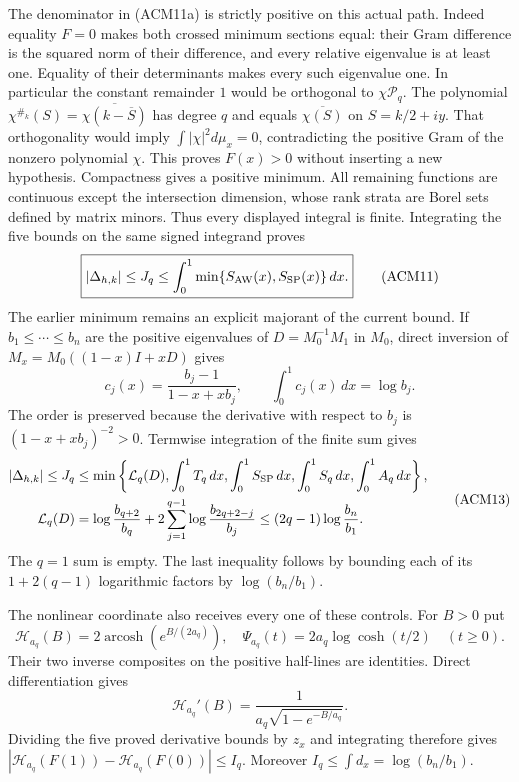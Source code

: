 The denominator in (ACM11a) is strictly positive on this actual path.
Indeed equality $F=0$ makes both crossed minimum sections equal:
their Gram difference is the squared norm of their difference,
and every relative eigenvalue is at least one. Equality of their
determinants makes every such eigenvalue one. In particular the
constant remainder $1$ would be orthogonal to $\chi\mathcal P_q$.
The polynomial $\chi^{\#_k}(S)=\overline{\chi(k-\overline S)}$
has degree $q$ and equals $\overline{\chi(S)}$ on $S=k/2+iy$.
That orthogonality would imply $\int|\chi|^2d\mu_x=0$, contradicting
the positive Gram of the nonzero polynomial $\chi$. This proves
$F(x)>0$ without inserting a new hypothesis. Compactness gives a
positive minimum. All remaining functions are continuous except
the intersection dimension, whose rank strata are Borel sets
defined by matrix minors. Thus every displayed integral is finite.
Integrating the five bounds on the same signed integrand proves
\[
 \boxed{|\Delta_{h,k}|\leq J_q
 \leq\int_0^1\min\{S_{\rm AW}(x),S_{\rm SP}(x)\}\,dx.}
 \tag{ACM11}
\]
The earlier minimum remains an explicit majorant of the current bound.
If $b_1\leq\cdots\leq b_n$ are the positive eigenvalues of
$D=M_0^{-1}M_1$ in $M_0$, direct inversion of
$M_x=M_0((1-x)I+xD)$ gives
\[
 c_j(x)=\frac{b_j-1}{1-x+xb_j},\qquad
 \int_0^1c_j(x)\,dx=\log b_j.
 \tag{ACM12}
\]
The order is preserved because the derivative with respect to $b_j$
is $(1-x+xb_j)^{-2}>0$. Termwise integration of the finite sum gives
\[
\begin{split}
 |\Delta_{h,k}|\leq J_q
 &\leq\min\left\{\mathcal L_q(D),\int_0^1T_q\,dx,
 \int_0^1S_{\rm SP}\,dx,\int_0^1S_q\,dx,\int_0^1A_q\,dx\right\},\\
 \mathcal L_q(D)&=\log\frac{b_{q+2}}{b_q}
       +2\sum_{j=1}^{q-1}\log\frac{b_{2q+2-j}}{b_j}
       \leq(2q-1)\log\frac{b_n}{b_1}.
\end{split}
\tag{ACM13}
\]
The $q=1$ sum is empty. The last inequality follows by bounding
each of its $1+2(q-1)$ logarithmic factors by $\log(b_n/b_1)$.

The nonlinear coordinate also receives every one of these controls.
For $B>0$ put
\[
 \mathscr H_{a_q}(B)=2\operatorname{arcosh}(e^{B/(2a_q)}),\quad
 \Psi_{a_q}(t)=2a_q\log\cosh(t/2)\quad(t\geq0).
 \tag{ACM14}
\]
Their two inverse composites on the positive half-lines are identities.
Direct differentiation gives
\[
 \mathscr H_{a_q}'(B)=\frac{1}{a_q\sqrt{1-e^{-B/a_q}}}.
\]
Dividing the five proved derivative bounds
by $z_x$ and integrating therefore gives
$|\mathscr H_{a_q}(F(1))-\mathscr H_{a_q}(F(0))|\leq I_q$.
Moreover $I_q\leq\int d_x=\log(b_n/b_1)$.

